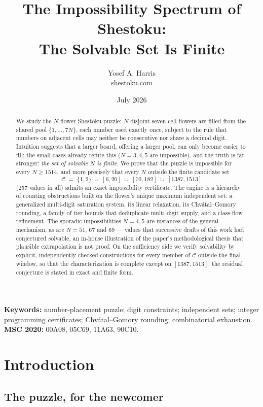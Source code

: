 \documentclass[11pt]{article}
\title{The Impossibility Spectrum of Shestoku:\\ \Large The Solvable Set Is Finite}
\author{Yosef A. Harris\\ \small shestoku.com}
\date{July 2026}
\theoremstyle{definition}
\theoremstyle{remark}
\begin{document}
\maketitle

\begin{abstract}
We study the $N$-flower Shestoku puzzle: $N$ disjoint seven-cell flowers are filled from the shared pool $\{1,\dots,7N\}$, each number used exactly once, subject to the rule that numbers on adjacent cells may neither be consecutive nor share a decimal digit. Intuition suggests that a larger board, offering a larger pool, can only become easier to fill; the small cases already refute this ($N=3,4,5$ are impossible), and the truth is far stronger: \emph{the set of solvable $N$ is finite}. We prove that the puzzle is impossible for every $N\ge 1514$, and more precisely that every $N$ outside the finite candidate set
\[
\mathcal{C} \;=\; \{1,2\}\;\cup\;[6,20]\;\cup\;[70,182]\;\cup\;[1387,1513]
\]
(257 values in all) admits an exact impossibility certificate. The engine is a hierarchy of counting obstructions built on the flower's unique maximum independent set: a generalized multi-digit saturation system, its linear relaxation, its Chv\'atal--Gomory rounding, a family of tier bounds that deduplicate multi-digit supply, and a class-flow refinement. The sporadic impossibilities $N=4,5$ are instances of the general mechanism, as are $N=51$, $67$ and $69$ --- values that successive drafts of this work had conjectured solvable, an in-house illustration of the paper's methodological thesis that plausible extrapolation is not proof. On the sufficiency side we verify solvability by explicit, independently checked constructions for every member of $\mathcal{C}$ outside the final window, so that the characterization is complete except on $[1387,1513]$; the residual conjecture is stated in exact and finite form.
\end{abstract}

\medskip
\noindent\textbf{Keywords:} number-placement puzzle; digit constraints; independent sets; integer programming certificates; Chv\'atal--Gomory rounding; combinatorial exhaustion.\\
\textbf{MSC 2020:} 00A08, 05C69, 11A63, 90C10.

\section{Introduction}

\subsection*{The puzzle, for the newcomer}
\end{document}
